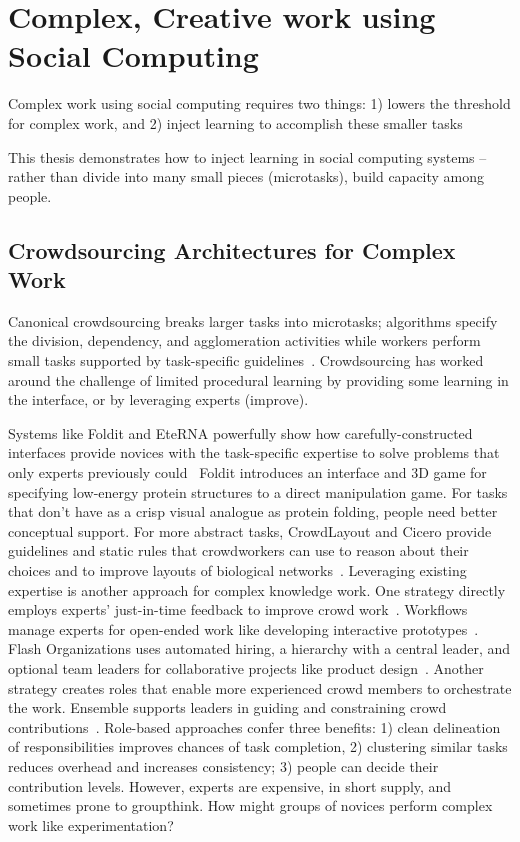 \section{Complex, Creative work using Social Computing}

Complex work using social computing requires two things:
1) lowers the threshold for complex work, and 
2) inject learning to accomplish these smaller tasks

This thesis demonstrates how to inject learning in social computing systems
-- rather than divide into many small pieces (microtasks), build capacity among people. 

\subsection{Crowdsourcing Architectures for Complex Work}
Canonical crowdsourcing breaks larger tasks into microtasks; algorithms specify the division,
dependency, and agglomeration activities while workers perform small tasks supported by task-specific
guidelines~\cite{kittur2012future}. Crowdsourcing has worked around the challenge of limited procedural
learning by providing some learning in the interface, or by leveraging experts (improve).

Systems like Foldit and EteRNA powerfully show how carefully-constructed interfaces provide
novices with the task-specific expertise to solve problems that only experts previously could~\cite{Cooper2010, Lasecki2012, Lee2014, Zooniverse2007}
Foldit introduces an interface and 3D game for specifying low-energy protein structures
to a direct manipulation game. For tasks that don’t have as a crisp visual analogue as protein
folding, people need better conceptual support. For more abstract tasks, CrowdLayout and Cicero
provide guidelines and static rules that crowdworkers can use to reason about their choices and
to improve layouts of biological networks~\cite{Singh:2018:CCD:3173574.3173806, chen2019cicero}.
Leveraging existing expertise is another approach for complex knowledge work. One strategy
directly employs experts’ just-in-time feedback to improve crowd work~\cite{dow2012shepherding}. Workflows manage
experts for open-ended work like developing
interactive prototypes~\cite{Retelny2014}. Flash Organizations
uses automated hiring, a hierarchy with
a central leader, and optional team leaders for
collaborative projects like product design~\cite{Valentine2017}.
Another strategy creates roles that enable
more experienced crowd members to orchestrate
the work. Ensemble supports leaders in
guiding and constraining crowd contributions~\cite{Kim2014e}. Role-based approaches confer three benefits:
1) clean delineation of responsibilities improves
chances of task completion, 2) clustering
similar tasks reduces overhead and increases
consistency; 3) people can decide their
contribution levels. However, experts are expensive,
in short supply, and sometimes prone
to groupthink. How might groups of novices
perform complex work like experimentation?

